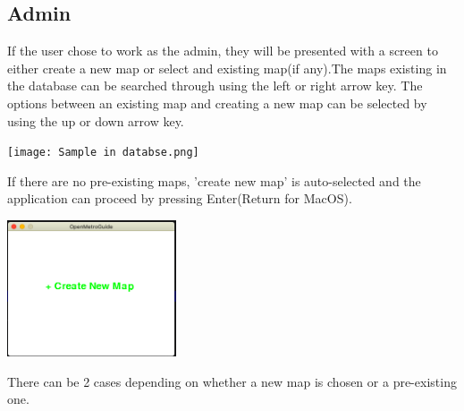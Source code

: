 \documentclass[fontsize=11pt]{article}
\begin{document}
    \subsection*{Admin}
    If the user chose to work as the admin, they will be presented with a screen to either create a new map or select and existing map(if any).The maps existing in the database can be searched through using the left or right arrow key. The options between an existing map and creating a new map can be selected by using the up or down arrow key.\\
    \begin{center}
        \texttt{[image: Sample in databse.png]}\\
    \end{center}
    If there are no pre-existing maps, 'create new map' is auto-selected and the application can proceed by pressing Enter(Return for MacOS).\\
    \begin{center}
        \includegraphics[width = 5cm]{create new map.png}\\
    \end{center}
    There can be 2 cases depending on whether a new map is chosen or a pre-existing one.
\end{document}

